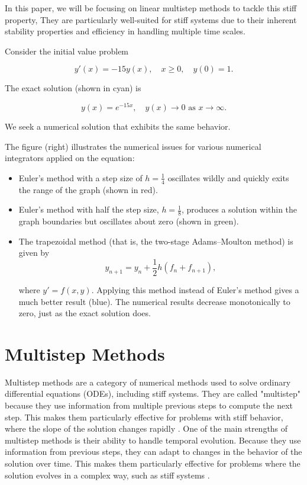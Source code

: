 In this paper, we will be focusing on linear multistep methods to tackle this stiff property,  They are particularly well-suited for stiff systems due to their inherent stability properties and efficiency in handling multiple time scales.





Consider the initial value problem

\[
y'(x) = -15y(x), \quad x \geq 0, \quad y(0) = 1. \tag{1}
\]

The exact solution (shown in cyan) is

\[
y(x) = e^{-15x}, \quad y(x) \rightarrow 0 \text{ as } x \rightarrow \infty. \tag{2}
\]

We seek a numerical solution that exhibits the same behavior.

The figure (right) illustrates the numerical issues for various numerical integrators applied on the equation:
\begin{itemize}
    \item Euler's method with a step size of $h = \frac{1}{4}$ oscillates wildly and quickly exits the range of the graph (shown in red).
    \item Euler's method with half the step size, $h = \frac{1}{8}$, produces a solution within the graph boundaries but oscillates about zero (shown in green).
    \item The trapezoidal method (that is, the two-stage Adams–Moulton method) is given by
    \begin{equation}
      y_{n+1} = y_{n} + \frac{1}{2}h \left( f_{n} + f_{n+1} \right),
    \end{equation}

    where $y' = f(x,y)$. Applying this method instead of Euler's method gives a much better result (blue). The numerical results decrease monotonically to zero, just as the exact solution does.
\end{itemize}

\section{Multistep Methods}
Multistep methods are a category of numerical methods used to solve ordinary differential equations (ODEs), including stiff systems. They are called "multistep" because they use information from multiple previous steps to compute the next step. This makes them particularly effective for problems with stiff behavior, where the slope of the solution changes rapidly \cite{math7121158}.
One of the main strengths of multistep methods is their ability to handle temporal evolution. Because they use information from previous steps, they can adapt to changes in the behavior of the solution over time. This makes them particularly effective for problems where the solution evolves in a complex way, such as stiff systems \cite{math7121158}.


